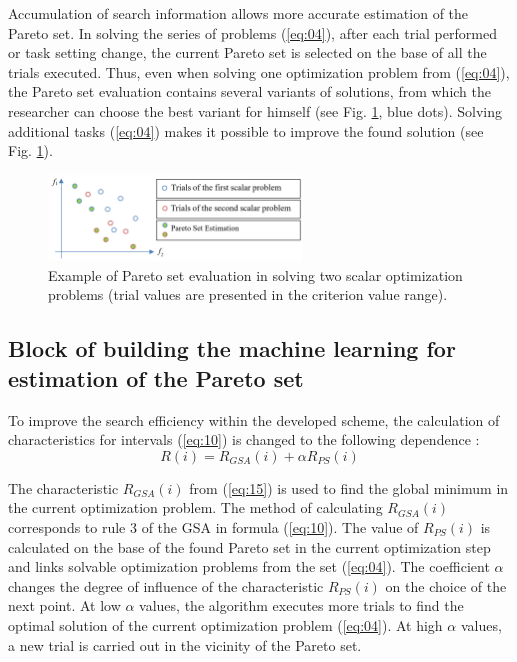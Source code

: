 \documentclass[runningheads]{llncs}
\begin{document}
Accumulation of search information allows more accurate estimation of the Pareto set. In solving the series of problems (\ref{eq:04}), after each trial performed or task setting change, the current Pareto set is selected on the base of all the trials executed. Thus, even when solving one optimization problem from (\ref{eq:04}), the Pareto set evaluation contains several variants of solutions, from which the researcher can choose the best variant for himself (see Fig. \ref{fig2}, blue dots). Solving additional tasks (\ref{eq:04}) makes it possible to improve the found solution (see Fig. \ref{fig2}).

\begin{figure}
\center
\includegraphics[width=0.6\textwidth]{fig2.png}
\caption{Example of Pareto set evaluation in solving two scalar optimization problems (trial values are presented in the criterion value range).} \label{fig2}
\end{figure}


\subsection{Block of  building the machine learning for estimation of the Pareto set}
\label{subsec34}

To improve the search efficiency within the developed scheme, the calculation of characteristics for intervals (\ref{eq:10}) is changed to the following dependence \cite{Konnov2025}:
\begin{equation}
    \label{eq:15}
    R(i) = R_{GSA} (i) +  \alpha R_{PS} (i)
\end{equation}

The characteristic $R_{GSA}(i)$ from (\ref{eq:15}) is used to find the global minimum in the current optimization problem. The method of calculating $R_{GSA}(i)$ corresponds to rule 3 of the GSA in formula (\ref{eq:10}). The value of $R_{PS}(i)$ is calculated on the base of the found Pareto set in the current optimization step and links solvable optimization problems from the set (\ref{eq:04}). The coefficient $\alpha$ changes the degree of influence of the characteristic  $R_{PS}(i)$ on the choice of the next point. At low $\alpha$ values, the algorithm executes more trials to find the optimal solution of the current optimization problem (\ref{eq:04}). At high $\alpha$ values, a new trial is carried out in the vicinity of the Pareto set. 
\end{document}
